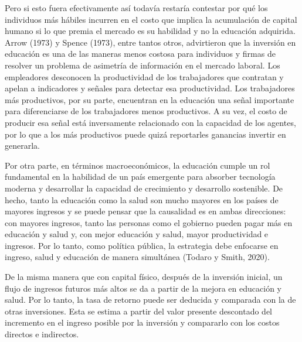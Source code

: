 \documentclass[a4paper]{article}
\theoremstyle{plain}
\theoremstyle{definition}
\begin{document}
Pero si esto fuera efectivamente así todavía restaría contestar por qué los individuos más hábiles incurren en el costo que implica la acumulación de capital humano si lo que premia el mercado es su habilidad y no la educación adquirida. Arrow (1973) y Spence (1973), entre tantos otros, advirtieron que la inversión en educación es una de las maneras menos costosa para individuos y firmas de resolver un problema de asimetría de información en el mercado laboral. Los empleadores desconocen la productividad de los trabajadores que contratan y apelan a indicadores y señales para detectar esa productividad. Los trabajadores más productivos, por su parte, encuentran en la educación una señal importante para diferenciarse de los trabajadores menos productivos. A su vez, el costo de producir esa señal está inversamente relacionado con la capacidad de los agentes, por lo que a los más productivos puede quizá reportarles ganancias invertir en generarla.

Por otra parte, en términos macroeconómicos, la educación cumple un rol fundamental en la habilidad de un país emergente para absorber tecnología moderna y desarrollar la capacidad de crecimiento y desarrollo sostenible. De hecho, tanto la educación como la salud son mucho mayores en los países de mayores ingresos y se puede pensar que la causalidad es en ambas direcciones: con mayores ingresos, tanto las personas como el gobierno pueden pagar más en educación y salud y, con mejor educación y salud, mayor productividad e ingresos. Por lo tanto, como política pública, la estrategia debe enfocarse en ingreso, salud y educación de manera simultánea (Todaro y Smith, 2020).

De la misma manera que con capital físico, después de la inversión inicial, un flujo de ingresos futuros más altos se da a partir de la mejora en educación y salud. Por lo tanto, la tasa de retorno puede ser deducida y comparada con la de otras inversiones. Esta se estima a partir del valor presente descontado del incremento en el ingreso posible por la inversión y compararlo con los costos directos e indirectos. 
\end{document}
